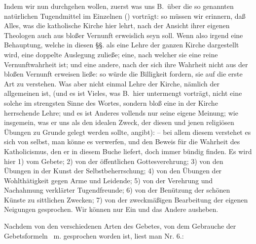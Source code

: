 Indem wir nun durchgehen wollen, zuerst was uns B.\ über die so genannten natürlichen Tugendmittel im Einzelnen () vorträgt: so müssen wir erinnern, daß Alles, was die katholische Kirche hier lehrt, nach der Ansicht ihrer eigenen Theologen auch aus bloßer Vernunft erweislich seyn soll. Wenn also irgend eine Behauptung, welche in diesen §§. als eine Lehre der ganzen Kirche dargestellt wird, eine doppelte Auslegung zuließe; eine, nach welcher sie eine reine Vernunftwahrheit ist; und eine andere, nach der sich ihre Wahrheit nicht aus der bloßen Vernunft erweisen ließe: so würde die Billigkeit fordern, sie auf die erste Art zu verstehen. Was aber nicht einmal Lehre der Kirche, nämlich der allgemeinen ist, (und es ist Vieles, was B.\ hier untermengt vorträgt, nicht eine solche im strengsten Sinne des Wortes, sondern bloß eine in der Kirche herrschende Lehre; und es ist Anderes vollends nur seine eigene Meinung; wie insgemein, was er uns als den idealen Zweck, der diesen und jenen religiösen Übungen zu Grunde gelegt werden sollte, angibt): -- bei allem diesem verstehet es sich von selbst, man könne es verwerfen, und den Beweis für die Wahrheit des Katholicismus, den er in diesem Buche liefert, doch immer bündig finden. Es wird hier 1) vom Gebete; 2) von der öffentlichen Gottesverehrung; 3) von den Übungen in der Kunst der Selbstbeherrschung; 4) von den Übungen der Wohlthätigkeit gegen Arme und Leidende; 5) von der Verehrung und Nachahmung verklärter Tugendfreunde; 6) von der Benützung der schönen Künste zu sittlichen Zwecken; 7) von der zweckmäßigen Bearbeitung der eigenen Neigungen gesprochen. Wir können nur Ein und das Andere ausheben. \par
Nachdem  von den verschiedenen Arten des Gebetes, von dem Gebrauche der Gebetsformeln \ua\  m. gesprochen worden ist, liest man Nr. 6.:  \par
